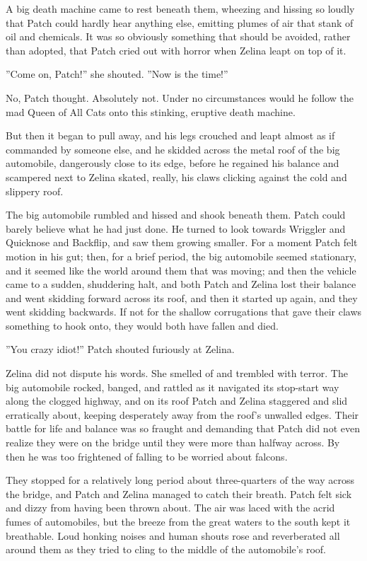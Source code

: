 \documentclass[12pt]{book}
\begin{document}
A big death machine came to rest beneath them, wheezing and hissing so loudly that Patch could hardly hear anything else, emitting plumes of air that stank of oil and chemicals. It was so obviously something that should be avoided, rather than adopted, that Patch cried out with horror when Zelina leapt on top of it.

''Come on, Patch!'' she shouted. ''Now is the time!''

No, Patch thought. Absolutely not. Under no circumstances would he follow the mad Queen of All Cats onto this stinking, eruptive death machine.

But then it began to pull away, and his legs crouched and leapt almost as if commanded by someone else, and he skidded across the metal roof of the big automobile, dangerously close to its edge, before he regained his balance and scampered next to Zelina %
skated, really, his claws clicking against the cold and slippery roof.

The big automobile rumbled and hissed and shook beneath them. Patch could barely believe what he had just done. He turned to look towards Wriggler and Quicknose and Backflip, and saw them growing smaller. For a moment Patch felt motion in his gut; then, for a brief period, the big automobile seemed stationary, and it seemed like the world around them that was moving; and then the vehicle came to a sudden, shuddering halt, and both Patch and Zelina lost their balance and went skidding forward across its roof, and then it started up again, and they went skidding backwards. If not for the shallow corrugations that gave their claws something to hook onto, they would both have fallen and died.

''You crazy idiot!'' Patch shouted furiously at Zelina.

Zelina did not dispute his words. She smelled of and trembled with terror. The big automobile rocked, banged, and rattled as it navigated its stop-start way along the clogged highway, and on its roof Patch and Zelina staggered and slid erratically about, keeping desperately away from the roof's unwalled edges. Their battle for life and balance was so fraught and demanding that Patch did not even realize they were on the bridge until they were more than halfway across. By then he was too frightened of falling to be worried about falcons.

They stopped for a relatively long period about three-quarters of the way across the bridge, and Patch and Zelina managed to catch their breath. Patch felt sick and dizzy from having been thrown about. The air was laced with the acrid fumes of automobiles, but the breeze from the great waters to the south kept it breathable. Loud honking noises and human shouts rose and reverberated all around them as they tried to cling to the middle of the automobile's roof.
\end{document}

